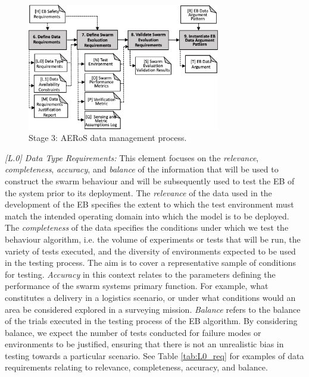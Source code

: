 \documentclass[runningheads]{llncs}
\begin{document}
\begin{figure}[!t]
	\centering
	\includegraphics[width=0.75\textwidth]{figures/AMLAS-STAGE-3-V4.png}
	\vspace{-2ex}
	\caption{Stage 3: AERoS data management process.}
	\label{amlas-a-stage3}
	\vspace{-4ex}
\end{figure}

\emph{[L.0] Data Type Requirements:}
This element focuses on the \emph{relevance}, \emph{completeness}, \emph{accuracy}, and \emph{balance} of the information that will be used to construct the swarm behaviour and will be subsequently used to test the EB of the system prior to its deployment. The \emph{relevance} of the data used in the development of the EB specifies the extent to which the test environment must match the intended operating domain into which the model is to be deployed. The \emph{completeness} of the data specifies the conditions under which we test the behaviour algorithm, i.e. the volume of experiments or tests that will be run, the variety of tests executed, and the diversity of environments expected to be used in the testing process. The aim is to cover a representative sample of conditions for testing. \emph{Accuracy} in this context relates to the parameters defining the performance of the swarm systems primary function. For example, what constitutes a delivery in a logistics scenario, or under what conditions would an area be considered explored in a surveying mission. \emph{Balance} refers to the balance of the trials executed in the testing process of the EB algorithm. By considering balance, we expect the number of tests conducted for failure modes or environments to be justified, ensuring that there is not an unrealistic bias in testing towards a particular scenario. See Table \ref{tab:L0_req} for examples of data requirements relating to relevance, completeness, accuracy, and balance.
\end{document}
